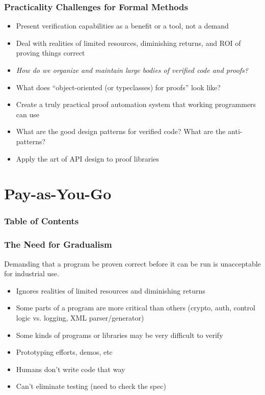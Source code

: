 \documentclass{beamer}
\begin{document}
\begin{frame}
  \frametitle{Practicality Challenges for Formal Methods}
  \begin{itemize}
    \item Present verification capabilities as a benefit or a tool,
      not a demand
    \item Deal with realities of limited resources, diminishing
      returns, and ROI of proving things correct
    \item \emph{How do we organize and maintain large bodies of
      verified code and proofs?}
    \item What does ``object-oriented (or typeclasses) for proofs''
      look like?
    \item Create a truly practical proof automation system that
      working programmers can use
    \item What are the good design patterns for verified code?  What
      are the anti-patterns?
    \item Apply the art of API design to proof libraries
  \end{itemize}
\end{frame}

\section{Pay-as-You-Go}

\begin{frame}
  \frametitle{Table of Contents}
  \tableofcontents[currentsection]
\end{frame}

\begin{frame}
  \frametitle{The Need for Gradualism}

  Demanding that a program be proven correct before it can be run is
  unacceptable for industrial use.
  \begin{itemize}
    \item Ignores realities of limited resources and diminishing returns
    \item Some parts of a program are more critical than others
      (crypto, auth, control logic vs. logging, XML parser/generator)
    \item Some kinds of programs or libraries may be very difficult to verify
    \item Prototyping efforts, demos, etc
    \item Humans don't write code that way
    \item Can't eliminate testing (need to check the spec)
  \end{itemize}
\end{frame}
\end{document}

